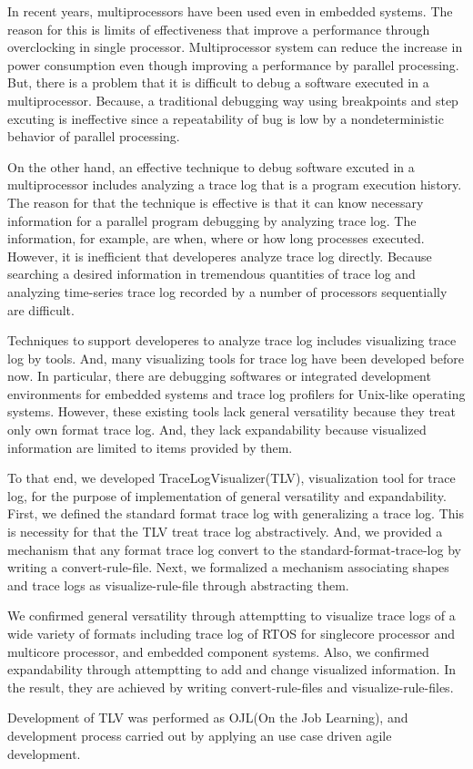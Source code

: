 In recent years, multiprocessors have been used even in embedded systems.
The reason for this is limits of effectiveness that improve a performance through overclocking in single processor.
Multiprocessor system can reduce the increase in power consumption even though improving a performance by parallel processing.
But, there is a problem that it is difficult to debug a software executed in a multiprocessor.
Because, a traditional debugging way using breakpoints and step excuting is ineffective since a repeatability of bug is low by a nondeterministic behavior of parallel processing.

On the other hand, an effective technique to debug software excuted in a multiprocessor includes analyzing a trace log that is a program execution history.
The reason for that the technique is effective is that it can know necessary information for a parallel program debugging by analyzing trace log.
The information, for example, are when, where or how long processes executed.
However, it is inefficient that developeres analyze trace log directly. Because searching a desired information in tremendous quantities of trace log and analyzing time-series trace log recorded by a number of processors sequentially are difficult.

Techniques to support developeres to analyze trace log includes visualizing trace log by tools.
And, many visualizing tools for trace log have been developed before now.
In particular, there are debugging softwares or integrated development environments for embedded systems and trace log profilers for Unix-like operating systems.
However, these existing tools lack general versatility because they treat only own format trace log. 
And, they lack expandability because visualized information are limited to items provided by them.

To that end, we developed TraceLogVisualizer(TLV), visualization tool for trace log, for the purpose of implementation of general versatility and expandability.
First, we defined the standard format trace log with generalizing a trace log.
This is necessity for that the TLV treat trace log abstractively.
And, we provided a mechanism that any format trace log convert to the standard-format-trace-log by writing a convert-rule-file.
Next, we formalized a mechanism associating shapes and trace logs as visualize-rule-file through abstracting them.

We confirmed general versatility through attemptting to visualize trace logs of a wide variety of formats including trace log of RTOS for singlecore processor and multicore processor, and embedded component systems.
Also, we confirmed expandability through attemptting to add and change visualized information.
In the result, they are achieved by writing convert-rule-files and visualize-rule-files.

Development of TLV was performed as OJL(On the Job Learning), and development process carried out by applying an use case driven agile development.
